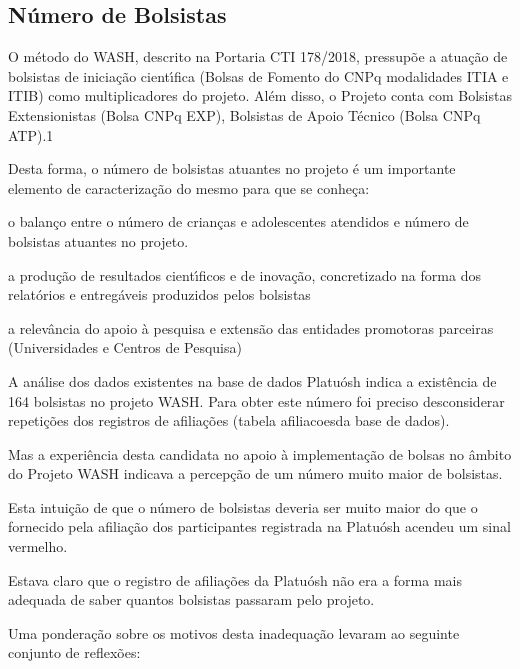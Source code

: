 \documentclass[
12pt,		%
openright,	%
twoside,  %
a4paper,			%
chapter=TITLE,		%
english,			%
french,				%
spanish,			%
brazil				%
]{USPSC-classe/USPSC}
\begin{document}
\subsection[N\'umero de Bolsistas]{N\'umero de Bolsistas}\label{N\'umero de Bolsistas}
O m\'etodo do WASH, descrito na Portaria CTI 178/2018, pressup\~oe a atua\c{c}\~ao de bolsistas de inicia\c{c}\~ao cient\'{\i}fica (Bolsas de Fomento do CNPq modalidades ITIA e ITIB) como multiplicadores do projeto. Al\'em disso, o Projeto conta com Bolsistas Extensionistas (Bolsa CNPq EXP), Bolsistas de Apoio T\'ecnico (Bolsa CNPq ATP).1


Desta forma, o n\'umero de bolsistas atuantes no projeto \'e um importante elemento de caracteriza\c{c}\~ao do mesmo para que se conhe\c{c}a:



\begin{alineas}
\item o balan\c{c}o entre o n\'umero de crian\c{c}as e adolescentes atendidos e n\'umero de  bolsistas atuantes no projeto.
\item a produ\c{c}\~ao de resultados cient\'{\i}ficos e de inova\c{c}\~ao, concretizado na forma dos relat\'orios  e entreg\'aveis produzidos pelos bolsistas
\item a relev\^ancia do apoio \`a pesquisa e extens\~ao das entidades promotoras parceiras (Universidades e Centros de Pesquisa)
\end{alineas}

A an\'alise dos dados existentes na base de dados Platu\'osh indica a exist\^encia de 164 bolsistas no projeto WASH. Para obter este n\'umero foi preciso desconsiderar repeti\c{c}\~oes dos registros de afilia\c{c}\~oes (tabela \textquotedbl afiliacoes\textquotedbl  da base de dados).


Mas a experi\^encia desta candidata no apoio \`a implementa\c{c}\~ao de bolsas no \^ambito do Projeto WASH indicava a percep\c{c}\~ao de um n\'umero muito maior de bolsistas.


Esta intui\c{c}\~ao de que o n\'umero de bolsistas deveria ser muito maior do que o fornecido pela afilia\c{c}\~ao dos participantes registrada na Platu\'osh acendeu um sinal vermelho.


Estava claro que o registro de afilia\c{c}\~oes da Platu\'osh n\~ao era a forma mais adequada de saber quantos bolsistas passaram pelo projeto.





Uma pondera\c{c}\~ao sobre os motivos desta inadequa\c{c}\~ao levaram ao seguinte conjunto de reflex\~oes:
\end{document}
